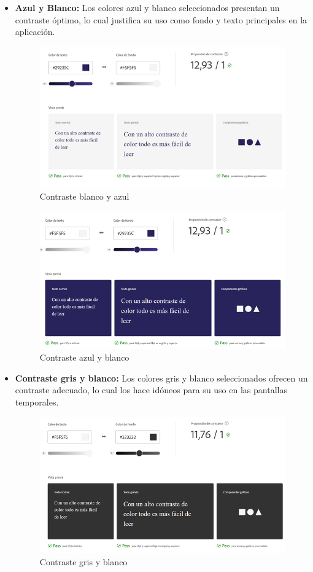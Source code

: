 \begin{itemize}

    \item \textbf{Azul y Blanco:} Los colores azul y blanco seleccionados presentan un contraste óptimo, lo cual justifica su uso como fondo y texto principales en la aplicación. 

    \begin{figure} [H]
        \centering
        \includegraphics[width=0.6\linewidth]{figuras/contraste_azul_blanco.png}
        \caption{Contraste blanco y azul}
        \label{fig:enter-label}
    \end{figure}


    \begin{figure} [H]
        \centering
        \includegraphics[width=0.6\linewidth]{figuras/contraste_blanco_azul.png}
        \caption{Contraste azul y blanco}
        \label{fig:enter-label}
    \end{figure}

  
    \item \textbf{Contraste gris y blanco:} Los colores gris y blanco seleccionados ofrecen un contraste adecuado, lo cual los hace idóneos para su uso en las pantallas temporales. 

    \begin{figure} [H]
        \centering
        \includegraphics[width=0.6\linewidth]{figuras/contraste_gris_blanco.png}
        \caption{Contraste gris y blanco}
        \label{fig:enter-label}
    \end{figure}
    

\end{itemize}
